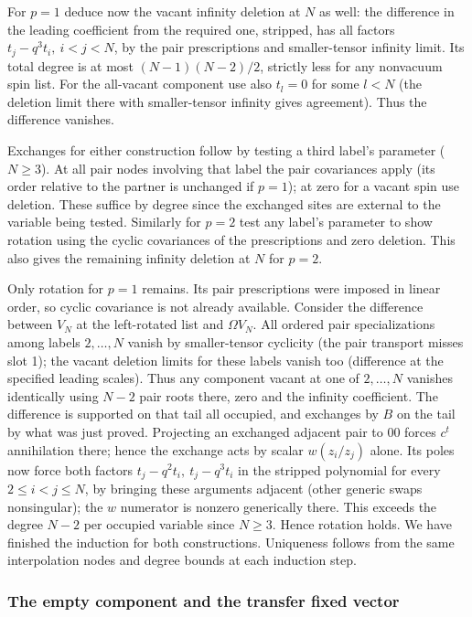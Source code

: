 For \(p=1\) deduce now the vacant infinity deletion at \(N\) as well: the difference in the leading coefficient from the required one, stripped, has all factors \(t_j-q^3t_i,\ i<j<N\), by the pair prescriptions and smaller-tensor infinity limit. Its total degree is at most \((N-1)(N-2)/2\), strictly less for any nonvacuum spin list. For the all-vacant component use also \(t_l=0\) for some \(l<N\) (the deletion limit there with smaller-tensor infinity gives agreement). Thus the difference vanishes.

Exchanges for either construction follow by testing a third label's parameter (\(N\ge3\)). At all pair nodes involving that label the pair covariances apply (its order relative to the partner is unchanged if \(p=1\)); at zero for a vacant spin use deletion. These suffice by degree since the exchanged sites are external to the variable being tested. Similarly for \(p=2\) test any label's parameter to show rotation using the cyclic covariances of the prescriptions and zero deletion. This also gives the remaining infinity deletion at \(N\) for \(p=2\).

Only rotation for \(p=1\) remains. Its pair prescriptions were imposed in
linear order, so cyclic covariance is not already available.
Consider the difference between \(V_N\) at the left-rotated list and
\(\Omega V_N\). All ordered pair specializations among labels
\(2,\ldots,N\) vanish by smaller-tensor cyclicity (the pair transport
misses slot 1); the vacant deletion limits for these labels vanish too
(difference at the specified leading scales). Thus any component vacant
at one of \(2,\ldots,N\) vanishes identically using \(N-2\) pair roots
there, zero and the infinity coefficient. The difference is supported on
that tail all occupied, and exchanges by \(B\) on the tail by what was
just proved. Projecting an exchanged adjacent pair to \(00\) forces
\(c^t\) annihilation there; hence the exchange acts by scalar
\(w(z_i/z_j)\) alone. Its poles now force both factors
\(t_j-q^2t_i,\ t_j-q^3t_i\) in the stripped polynomial for every
\(2\le i<j\le N\), by bringing these arguments adjacent (other generic
swaps nonsingular); the \(w\) numerator is nonzero generically there.
This exceeds the degree \(N-2\) per occupied variable since \(N\ge3\).
Hence rotation holds. We have finished the induction for both
constructions. Uniqueness follows from the same interpolation nodes and
degree bounds at each induction step.

\subsubsection{The empty component and the transfer fixed vector}

